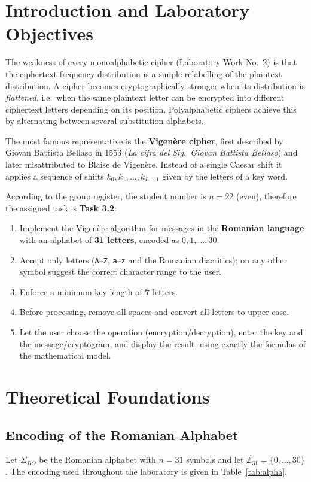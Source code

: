 \documentclass[12pt,a4paper]{article}
\begin{document}
\makereporttitle
\tableofcontents
\newpage

\section{Introduction and Laboratory Objectives}
The weakness of every monoalphabetic cipher (Laboratory Work No.~2) is that the ciphertext
frequency distribution is a simple relabelling of the plaintext distribution. A cipher becomes
cryptographically stronger when its distribution is \emph{flattened}, i.e.\ when the same
plaintext letter can be encrypted into different ciphertext letters depending on its position.
Polyalphabetic ciphers achieve this by alternating between several substitution alphabets.

The most famous representative is the \textbf{Vigenère cipher}, first described by Giovan
Battista Bellaso in 1553 (\emph{La cifra del Sig.\ Giovan Battista Bellaso}) and later
misattributed to Blaise de Vigenère. Instead of a single Caesar shift it applies a sequence of
shifts $k_0,k_1,\dots,k_{L-1}$ given by the letters of a key word.

According to the group register, the student number is $n = 22$ (even), therefore the assigned
task is \textbf{Task 3.2}:
\begin{enumerate}
  \item Implement the Vigenère algorithm for messages in the \textbf{Romanian language} with an
        alphabet of \textbf{31 letters}, encoded as $0,1,\dots,30$.
  \item Accept only letters (\texttt{A}–\texttt{Z}, \texttt{a}–\texttt{z} and the Romanian
        diacritics); on any other symbol suggest the correct character range to the user.
  \item Enforce a minimum key length of \textbf{7} letters.
  \item Before processing, remove all spaces and convert all letters to upper case.
  \item Let the user choose the operation (encryption/decryption), enter the key and the
        message/cryptogram, and display the result, using exactly the formulas of the
        mathematical model.
\end{enumerate}

\section{Theoretical Foundations}
\subsection{Encoding of the Romanian Alphabet}
Let $\Sigma_{RO}$ be the Romanian alphabet with $n = 31$ symbols and let
$\mathbb{Z}_{31}=\{0,\dots,30\}$. The encoding used throughout the laboratory is given in
Table~\ref{tab:alpha}.
\end{document}
